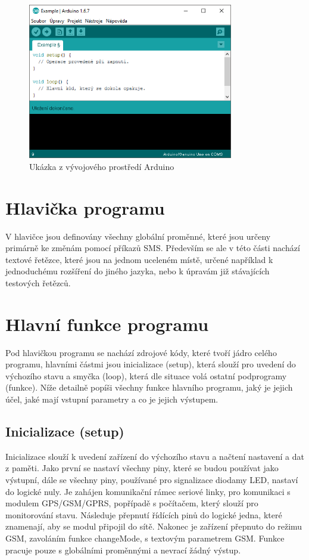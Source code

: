 \documentclass[FM,MP]{tulthesis}  %
\begin{document}
\begin{figure}[H]
\begin{center}
\includegraphics[width=0.8\textwidth]{images/arduino-ide.png}
\caption{Ukázka z vývojového prostředí Arduino}
\label{image}
\end{center}
\end{figure}


\section{Hlavička programu}
V hlavičce jsou definovány všechny globální proměnné, které jsou určeny primárně ke změnám pomocí příkazů SMS. Především se ale v této části nachází textové řetězce, které jsou na jednom uceleném místě, určené například k jednoduchému rozšíření do jiného jazyka, nebo k úpravám již stávajících testových řetězců.

\section{Hlavní funkce programu}
Pod hlavičkou programu se nachází zdrojové kódy, které tvoří jádro celého programu, hlavními částmi jsou inicializace (setup), která slouží pro uvedení do výchozího stavu a smyčka (loop), která dle situace volá ostatní podprogramy (funkce). Níže detailně popíši všechny funkce hlavního programu, jaký je jejich účel, jaké mají vstupní parametry a co je jejich výstupem.

\subsection{Inicializace (setup)}
Inicializace slouží k uvedení zařízení do výchozího stavu a načtení nastavení a dat z paměti. Jako první se nastaví všechny piny, které se budou používat jako výstupní, dále se všechny piny, používané pro signalizace diodamy LED, nastaví do logické nuly. Je zahájen komunikační rámec seriové linky, pro komunikaci s modulem GPS/GSM/GPRS, popřípadě s počítačem, který slouží pro monitorování stavu.  Následuje přepnutí řídících pinů do logické jedna, které znamenají, aby se modul připojil do sítě. Nakonec je zařízení přepnuto do režimu GSM, zavoláním funkce changeMode, s textovým parametrem GSM. Funkce pracuje pouze s globálními proměnnými a nevrací žádný výstup.
\end{document}
